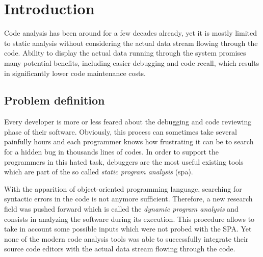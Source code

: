 
\chapter{Introduction} %
\label{chap:introduction}
Code analysis has been around for a few decades already, yet it is mostly limited to static analysis without considering the actual data stream flowing through the code. Ability to display the actual data running through the system promises many potential benefits, including easier debugging and code recall, which results in significantly lower code maintenance costs. 

\section{Problem definition}
Every developer is more or less feared about the debugging and code reviewing phase of their software. Obviously, this process can sometimes take several painfully hours and each programmer knows how frustrating it can be to search for a hidden bug in thousands lines of codes. In order to support the programmers in this hated task, debuggers are the most useful existing tools which are part of the so called \textit{static program analysis} (\gls{spa}). 

With the apparition of object-oriented programming language, searching for syntactic errors in the code is not anymore sufficient. Therefore, a new research field was pushed forward which is called the \textit{dynamic program analysis} and consists in analyzing the software during its execution. This procedure allows to take in account some possible inputs which were not probed with the SPA. Yet none of the modern code analysis tools was able to successfully integrate their source code editors with the actual data stream flowing through the code.


